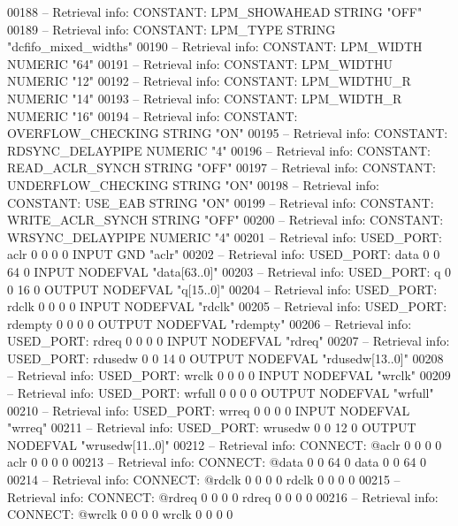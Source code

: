 \begin{DoxyCode}
{00188 \textcolor{keyword}{-- Retrieval info: CONSTANT: LPM\_SHOWAHEAD STRING "OFF"}
00189 \textcolor{keyword}{-- Retrieval info: CONSTANT: LPM\_TYPE STRING "dcfifo\_mixed\_widths"}
00190 \textcolor{keyword}{-- Retrieval info: CONSTANT: LPM\_WIDTH NUMERIC "64"}
00191 \textcolor{keyword}{-- Retrieval info: CONSTANT: LPM\_WIDTHU NUMERIC "12"}
00192 \textcolor{keyword}{-- Retrieval info: CONSTANT: LPM\_WIDTHU\_R NUMERIC "14"}
00193 \textcolor{keyword}{-- Retrieval info: CONSTANT: LPM\_WIDTH\_R NUMERIC "16"}
00194 \textcolor{keyword}{-- Retrieval info: CONSTANT: OVERFLOW\_CHECKING STRING "ON"}
00195 \textcolor{keyword}{-- Retrieval info: CONSTANT: RDSYNC\_DELAYPIPE NUMERIC "4"}
00196 \textcolor{keyword}{-- Retrieval info: CONSTANT: READ\_ACLR\_SYNCH STRING "OFF"}
00197 \textcolor{keyword}{-- Retrieval info: CONSTANT: UNDERFLOW\_CHECKING STRING "ON"}
00198 \textcolor{keyword}{-- Retrieval info: CONSTANT: USE\_EAB STRING "ON"}
00199 \textcolor{keyword}{-- Retrieval info: CONSTANT: WRITE\_ACLR\_SYNCH STRING "OFF"}
00200 \textcolor{keyword}{-- Retrieval info: CONSTANT: WRSYNC\_DELAYPIPE NUMERIC "4"}
00201 \textcolor{keyword}{-- Retrieval info: USED\_PORT: aclr 0 0 0 0 INPUT GND "aclr"}
00202 \textcolor{keyword}{-- Retrieval info: USED\_PORT: data 0 0 64 0 INPUT NODEFVAL "data[63..0]"}
00203 \textcolor{keyword}{-- Retrieval info: USED\_PORT: q 0 0 16 0 OUTPUT NODEFVAL "q[15..0]"}
00204 \textcolor{keyword}{-- Retrieval info: USED\_PORT: rdclk 0 0 0 0 INPUT NODEFVAL "rdclk"}
00205 \textcolor{keyword}{-- Retrieval info: USED\_PORT: rdempty 0 0 0 0 OUTPUT NODEFVAL "rdempty"}
00206 \textcolor{keyword}{-- Retrieval info: USED\_PORT: rdreq 0 0 0 0 INPUT NODEFVAL "rdreq"}
00207 \textcolor{keyword}{-- Retrieval info: USED\_PORT: rdusedw 0 0 14 0 OUTPUT NODEFVAL "rdusedw[13..0]"}
00208 \textcolor{keyword}{-- Retrieval info: USED\_PORT: wrclk 0 0 0 0 INPUT NODEFVAL "wrclk"}
00209 \textcolor{keyword}{-- Retrieval info: USED\_PORT: wrfull 0 0 0 0 OUTPUT NODEFVAL "wrfull"}
00210 \textcolor{keyword}{-- Retrieval info: USED\_PORT: wrreq 0 0 0 0 INPUT NODEFVAL "wrreq"}
00211 \textcolor{keyword}{-- Retrieval info: USED\_PORT: wrusedw 0 0 12 0 OUTPUT NODEFVAL "wrusedw[11..0]"}
00212 \textcolor{keyword}{-- Retrieval info: CONNECT: @aclr 0 0 0 0 aclr 0 0 0 0}
00213 \textcolor{keyword}{-- Retrieval info: CONNECT: @data 0 0 64 0 data 0 0 64 0}
00214 \textcolor{keyword}{-- Retrieval info: CONNECT: @rdclk 0 0 0 0 rdclk 0 0 0 0}
00215 \textcolor{keyword}{-- Retrieval info: CONNECT: @rdreq 0 0 0 0 rdreq 0 0 0 0}
00216 \textcolor{keyword}{-- Retrieval info: CONNECT: @wrclk 0 0 0 0 wrclk 0 0 0 0}
}
\end{DoxyCode}
